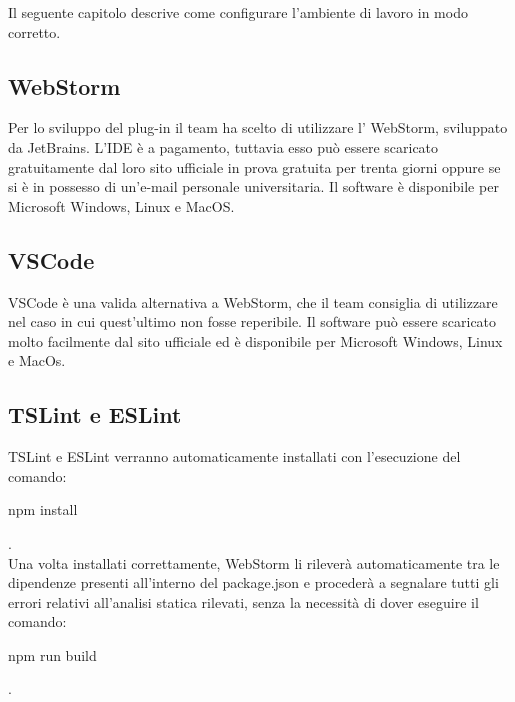 Il seguente capitolo descrive come configurare l'ambiente di lavoro in modo corretto.

\subsection{WebStorm}
Per lo sviluppo del plug-in il team ha scelto di utilizzare l' WebStorm, sviluppato da JetBrains. L'IDE è a pagamento, tuttavia esso può essere scaricato gratuitamente dal loro sito ufficiale in prova gratuita per trenta giorni oppure se si è in possesso di un'e-mail personale universitaria.
Il software è disponibile per Microsoft Windows, Linux e MacOS.
\subsection{VSCode}
VSCode è una valida alternativa a WebStorm, che il team consiglia di utilizzare nel caso in cui quest'ultimo non fosse reperibile.
Il software può essere scaricato molto facilmente dal sito ufficiale ed è disponibile per Microsoft Windows, Linux e MacOs.
\subsection{TSLint e ESLint}
TSLint e ESLint verranno automaticamente installati con l'esecuzione del comando:\\[0.2cm]
\hspace*{10mm}
\begin{ttfamily}
	npm install
\end{ttfamily}.\\[0.2cm]
Una volta installati correttamente, WebStorm li rileverà automaticamente tra le dipendenze presenti all'interno del package.json e procederà a segnalare tutti gli errori relativi all'analisi statica rilevati, senza la necessità di dover eseguire il comando:
\\[0.2cm]
\hspace*{10mm}
\begin{ttfamily}
npm run build
\end{ttfamily}.
\\[0.2cm]

\pagebreak